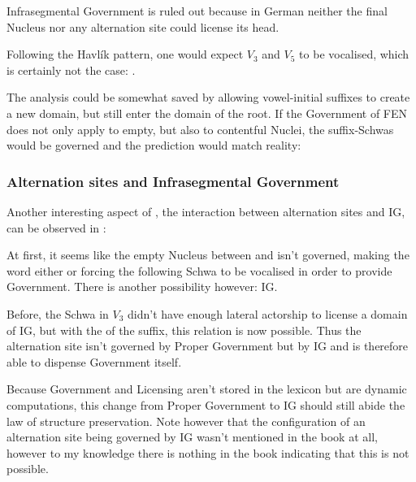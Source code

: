 Infrasegmental Government is ruled out because in German
neither the final Nucleus nor any alternation site could
license its head.

Following the Havlík pattern, one would expect $V_3$ and $V_5$
to be vocalised, which is certainly not the case: \ti{*[hand@ln@s]}.

The analysis could be somewhat saved by allowing vowel-initial suffixes
to create a new domain, but still enter the domain of the root.
If the Government of \gls{FEN} does not only apply to empty,
but also to contentful Nuclei, the suffix-Schwas would be governed
and the prediction would match reality:
\begin{structure}
  \emptyV
  \V[floating]{\textschwa}
  \fen[domain]
  \V[floating]{\textschwa}
  \fen[domain]
  \V[floating]{\textschwa}
  \fen
\end{structure}


\subsubsection{Alternation sites and Infrasegmental Government}
Another interesting aspect of \CVCV, the interaction between alternation
sites and \gls{IG}, can be observed in :
\begin{structure}
  \emptyV
  \V[floating]{\textschwa}
  \Ng
  \fen

\end{structure}
At first, it seems like the empty Nucleus between \ti{[n]} and \ti{[d]}
isn't governed, making the word either  or forcing
the following Schwa to be vocalised in order to provide Government.
There is another possibility however: \acrlong{IG}.

\medskip\noindent{}\par\medskip

Before, the Schwa in $V_3$ didn't have
enough lateral actorship to license a domain of \gls{IG},
but with the \ti{[U]} of the suffix, this relation is
now possible. Thus the alternation site isn't governed
by Proper Government but by \gls{IG} and is therefore
able to dispense Government itself.

Because Government and Licensing aren't stored in the lexicon
but are dynamic computations, this change from
Proper Government to \gls{IG} should still abide the
law of structure preservation. Note however that
the configuration of an alternation site being governed
by \gls{IG} wasn't mentioned in the book at all,
however to my knowledge there is nothing in the book indicating
that this is not possible.
\begin{structure}
  \emptyV
  \emptyV
  \Ng
  \fen

\end{structure}


